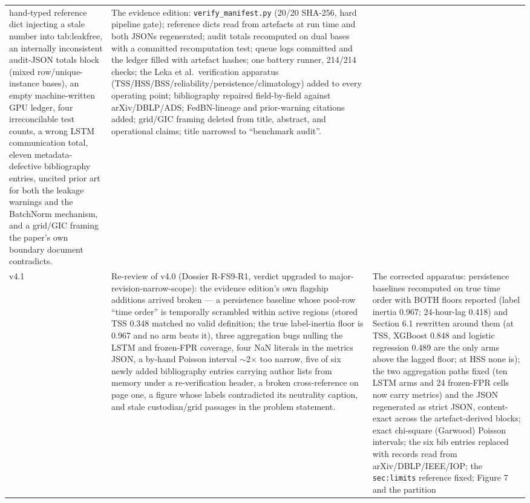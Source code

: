 \begin{longtable}{@{}p{} >{\raggedright\arraybackslash}p{} >{\raggedright\arraybackslash}p{}@{}}
hand-typed reference dict injecting a stale number into
tab:leakfree, an internally inconsistent audit-JSON totals block
(mixed row/unique-instance bases), an empty machine-written GPU
ledger, four irreconcilable test counts, a wrong LSTM communication
total, eleven metadata-defective bibliography entries, uncited
prior art for both the leakage warnings and the BatchNorm mechanism,
and a grid/GIC framing the paper's own boundary document
contradicts. & The evidence edition: \texttt{verify\_manifest.py}
(20/20 SHA-256, hard pipeline gate); reference dicts read from
artefacts at run time and both JSONs regenerated; audit totals
recomputed on dual bases with a committed recomputation test; queue
logs committed and the ledger filled with artefact hashes; one
battery runner, 214/214 checks; the Leka et al.\ verification
apparatus (TSS/HSS/BSS/reliability/persistence/climatology) added to
every operating point; bibliography repaired field-by-field against
arXiv/DBLP/ADS; FedBN-lineage and prior-warning citations added;
grid/GIC framing deleted from title, abstract, and operational
claims; title narrowed to ``benchmark audit''. \\
\addlinespace[2pt]
v4.1 & Re-review of v4.0 (Dossier R-FS9-R1, verdict upgraded to
major-revision-narrow-scope): the evidence edition's own flagship
additions arrived broken --- a persistence baseline whose
pool-row ``time order'' is temporally scrambled within active
regions (stored TSS 0.348 matched no valid definition; the true
label-inertia floor is 0.967 and no arm beats it), three aggregation
bugs nulling the LSTM and frozen-FPR coverage, four NaN literals in
the metrics JSON, a by-hand Poisson interval $\sim$2$\times$ too
narrow, five of six newly added bibliography entries carrying
author lists from memory under a re-verification header, a broken
cross-reference on page one, a figure whose labels contradicted
its neutrality caption, and stale custodian/grid passages in the
problem statement. & The corrected apparatus: persistence baselines
recomputed on true time order with BOTH floors reported (label
inertia 0.967; 24-hour-lag 0.418) and Section 6.1 rewritten around
them (at TSS, XGBoost 0.848 and logistic regression 0.489 are the
only arms above the lagged floor; at HSS none is); the two
aggregation paths fixed (ten LSTM arms and 24 frozen-FPR cells now
carry metrics) and the JSON regenerated as strict JSON, content-exact
across the artefact-derived blocks;
exact chi-square (Garwood) Poisson intervals; the six bib entries
replaced with records read from arXiv/DBLP/IEEE/IOP; the
\texttt{sec:limits} reference fixed; Figure 7 and the partition

\end{longtable}
